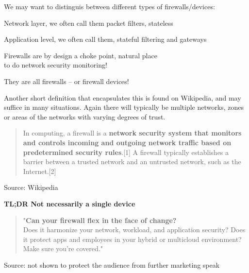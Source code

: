 \documentclass[Screen16to9,17pt]{foils}
\begin{document}

We may want to distinguis between different types of firewalls/devices:
\begin{list2}
\item Network layer, we often call them packet filters, stateless
\item Application level, we often call them, stateful filtering and gateways
\item Firewalls are by design a choke point, natural place \\
to do network security monitoring!
\end{list2}

They are all firewalls -- or firewall devices!


Another short definition that encapsulates this is found on Wikipedia, and may suffice in many situations. Again there will typically be multiple networks, zones or areas of the networks with varying degrees of trust.
\begin{quote}
In computing, a firewall is a {\bf network security system that monitors and controls incoming and outgoing network traffic based on predetermined security rules}.[1] A firewall typically establishes a barrier between a trusted network and an untrusted network, such as the Internet.[2]
\end{quote}
Source: Wikipedia

{\bf TL;DR Not necessarily a single device}




\begin{quote}
"{\bf Can your firewall flex in the face of change?}\\
Does it harmonize your network, workload, and application security? Does it protect apps and employees in your hybrid or multicloud environment? Make sure you're covered."
\end{quote}
Source: not shown to protect the audience from further marketing speak
\end{document}
